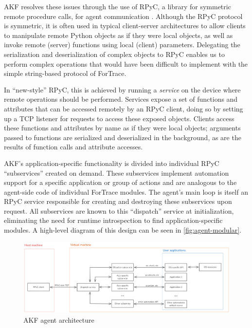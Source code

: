 \documentclass[final,5p,times,twocolumn]{elsarticle}
\begin{document}
AKF resolves these issues through the use of RPyC, a library for
symmetric remote procedure calls, for agent communication
\cite{TomerfilibaorgRpyc2025}. Although the RPyC protocol is
symmetric, it is often used in typical client-server architectures to
allow clients to manipulate remote Python objects as if they were local
objects, as well as invoke remote (server) functions using local
(client) parameters. Delegating the serialization and deserialization of
complex objects to RPyC enables us to perform complex operations that
would have been difficult to implement with the simple string-based
protocol of ForTrace.

In ``new-style'' RPyC, this is achieved by running a \emph{service} on
the device where remote operations should be performed. Services expose
a set of functions and attributes that can be accessed remotely by an
RPyC client, doing so by setting up a TCP listener for requests to
access these exposed objects. Clients access these functions and
attributes by name as if they were local objects; arguments passed to
functions are serialized and deserialized in the background, as are the
results of function calls and attribute accesses.

AKF's application-specific functionality is divided into individual RPyC
``subservices'' created on demand. These subservices implement
automation support for a specific application or group of actions and
are analogous to the agent-side code of individual ForTrace modules. The
agent's main loop is itself an RPyC service responsible for creating and
destroying these subservices upon request. All subservices are known to
this ``dispatch'' service at initialization, eliminating the need for
runtime introspection to find application-specific modules. A high-level
diagram of this design can be seen in \autoref{fig:agent-modular}.

\begin{figure}[htbp]
\centering
\includegraphics[width=1\linewidth]{agent-modular.png}
\caption{AKF agent architecture}\label{fig:agent-modular}
\end{figure}
\end{document}
